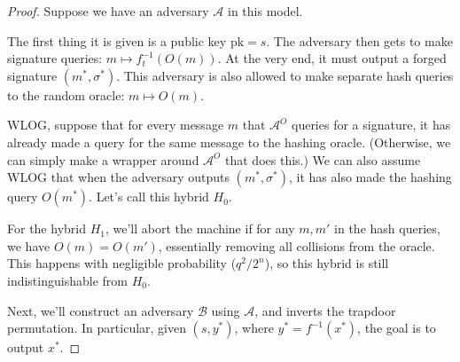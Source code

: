 \begin{proof}
    Suppose we have an adversary $\mathcal{A}$ in this model.

    The first thing it is given is a public key $\mathrm{pk} = s$. The adversary then gets to make signature queries: $m \mapsto f_t^{-1}(O(m))$. At the very end, it must output a forged signature $(m^*, \sigma^*)$. This adversary is also allowed to make separate hash queries to the random oracle: $m \mapsto O(m)$. %

    \begin{center}
    \end{center}

    WLOG, suppose that for every message $m$ that $\mathcal{A}^O$ queries for a signature, it has already made a query for the same message to the hashing oracle. (Otherwise, we can simply make a wrapper around $\mathcal{A}^O$ that does this.) We can also assume WLOG that when the adversary outputs $(m^*, \sigma^*)$, it has also made the hashing query $O(m^*)$. Let's call this hybrid $H_0$.

    For the hybrid $H_1$, we'll abort the machine if for any $m, m'$ in the hash queries, we have $O(m) = O(m')$, essentially removing all collisions from the oracle. This happens with negligible probability ($q^2 / 2^n$), so this hybrid is still indistinguishable from $H_0$.

    Next, we'll construct an adversary $\mathcal{B}$ using $\mathcal{A}$, and inverts the trapdoor permutation. In particular, given $(s, y^*)$, where $y^* = f^{-1}(x^*)$, the goal is to output $x^*$.


\end{proof}
